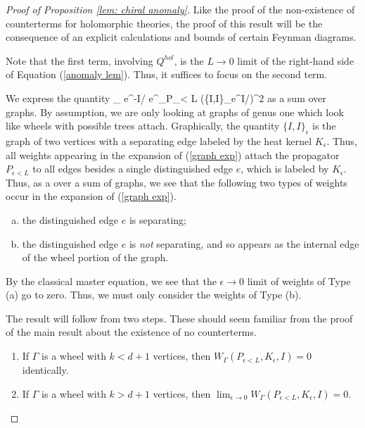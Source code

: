 \documentclass[11pt]{amsart}
\begin{document}
\begin{proof}[Proof of Proposition \ref{lem: chiral anomaly}]

Like the proof of the non-existence of counterterms for holomorphic theories, the proof of this result will be the consequence of an explicit calculations and bounds of certain Feynman diagrams. 

Note that the first term, involving $Q^{hol}$, is the $L \to 0$ limit of the right-hand side of Equation (\ref{anomaly lem}). 
Thus, it suffices to focus on the second term. 

We express the quantity
\be\label{graph exp}
\lim_{\epsilon {}} e^{-I/\hbar} e^{\hbar \partial_{P_{\epsilon < L}}} \left(\{I,I\}_\epsilon e^{I/\hbar}\right)\mod \hbar^2
\ee
as a sum over graphs.
By assumption, we are only looking at graphs of genus one which look like wheels with possible trees attach.
Graphically, the quantity $\{I,I\}_\epsilon$ is the graph of two vertices with a separating edge labeled by the heat kernel $K_\epsilon$.
Thus, all weights appearing in the expansion of (\ref{graph exp}) attach the propagator $P_{\epsilon<L}$ to all edges besides a single distinguished edge $e$, which is labeled by $K_\epsilon$. 
Thus, as a over a sum of graphs, we see that the following two types of weights occur in the expansion of (\ref{graph exp}).
\begin{enumerate}[(a)]
\item the distinguished edge $e$ is separating;
\item the distinguished edge $e$ is {\em not} separating, and so appears as the internal edge of the wheel portion of the graph.
\end{enumerate}

By the classical master equation, we see that the $\epsilon \to 0$ limit of weights of Type (a) go to zero.
Thus, we must only consider the weights of Type (b). 

The result will follow from two steps.
These should seem familiar from the proof of the main result about the existence of no counterterms.
\begin{enumerate}
\item If $\Gamma$ is a wheel with $k < d+1$ vertices, then $ W_\Gamma(P_{\epsilon < L}, K_\epsilon,I)
 = 0$ identically. 
\item If $\Gamma$ is a wheel with $k > d+1$ vertices, then $\lim_{\epsilon \to 0} W_\Gamma(P_{\epsilon < L}, K_\epsilon,I) =0$.
\end{enumerate} 


\end{proof}
\end{document}
